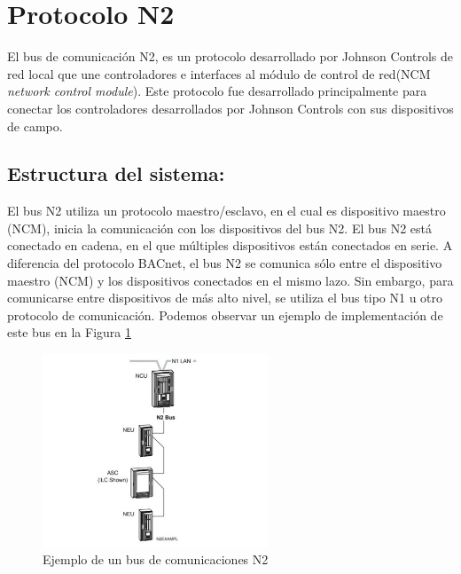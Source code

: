 \section{Protocolo N2}
El bus de comunicación N2, es un protocolo desarrollado por Johnson Controls de red local que une controladores e interfaces al módulo de control de red(NCM \textit{network control module}). Este protocolo fue desarrollado principalmente para conectar los controladores desarrollados por Johnson Controls con sus dispositivos de campo.

\subsection{Estructura del sistema:}
El bus N2 utiliza un protocolo maestro/esclavo, en el cual es dispositivo maestro (NCM), inicia la comunicación con los dispositivos del bus N2. El bus N2 está conectado en cadena, en el que múltiples dispositivos están conectados en serie. A diferencia del protocolo BACnet, el bus N2 se comunica sólo entre el dispositivo maestro (NCM) y los dispositivos conectados en el mismo lazo. Sin embargo, para comunicarse entre dispositivos de más alto nivel, se utiliza el bus tipo N1 u otro protocolo de comunicación. Podemos observar un ejemplo de implementación de este bus en la Figura \ref{fig:N2}

\begin{figure}[H]
    \centering
    \includegraphics[width=0.60\textwidth]{2_MainMatter/Capitulo1/Imagenes/N2_Johnson.JPG}
    \caption{Ejemplo de un bus de comunicaciones N2\cite{N2}}
    \label{fig:N2}
\end{figure}

